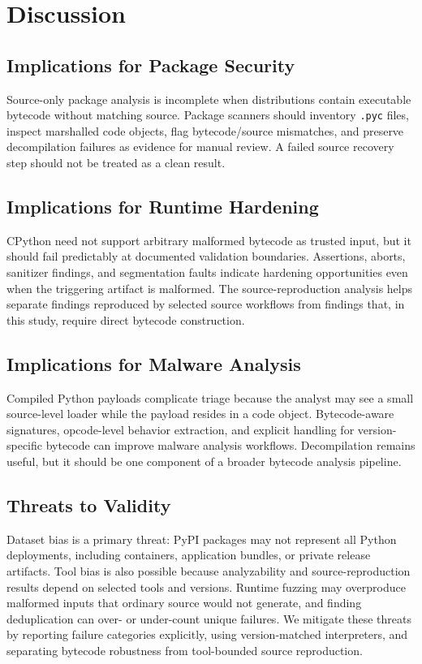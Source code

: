 \section{Discussion} \label{sec:diss}

\subsection{Implications for Package Security}

Source-only package analysis is incomplete when distributions contain executable bytecode without matching source.  Package scanners should inventory \texttt{.pyc} files, inspect marshalled code objects, flag bytecode/source mismatches, and preserve decompilation failures as evidence for manual review.  A failed source recovery step should not be treated as a clean result.

\subsection{Implications for Runtime Hardening}

CPython need not support arbitrary malformed bytecode as trusted input, but it should fail predictably at documented validation boundaries.  Assertions, aborts, sanitizer findings, and segmentation faults indicate hardening opportunities even when the triggering artifact is malformed.  The source-reproduction analysis helps separate findings reproduced by selected source workflows from findings that, in this study, require direct bytecode construction.

\subsection{Implications for Malware Analysis}

Compiled Python payloads complicate triage because the analyst may see a small source-level loader while the payload resides in a code object.  Bytecode-aware signatures, opcode-level behavior extraction, and explicit handling for version-specific bytecode can improve malware analysis workflows.  Decompilation remains useful, but it should be one component of a broader bytecode analysis pipeline.

\subsection{Threats to Validity}

Dataset bias is a primary threat: PyPI packages may not represent all Python deployments, including containers, application bundles, or private release artifacts.  Tool bias is also possible because analyzability and source-reproduction results depend on selected tools and versions.  Runtime fuzzing may overproduce malformed inputs that ordinary source would not generate, and finding deduplication can over- or under-count unique failures.  We mitigate these threats by reporting failure categories explicitly, using version-matched interpreters, and separating bytecode robustness from tool-bounded source reproduction.

